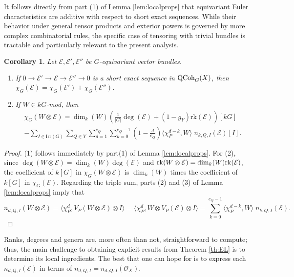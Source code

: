 \documentclass[10pt]{amsart}
\newtheorem{corollary}[theorem]{Corollary}
\theoremstyle{definition}
\begin{document}
It follows directly from part (1) of Lemma \ref{lem:localprops} that equivariant Euler characteristics are additive with respect to short exact sequences. While their behavior under general tensor products and exterior powers is governed by more complex combinatorial rules, the specific case of tensoring with trivial bundles is tractable and particularly relevant to the present analysis.
\begin{corollary}\label{eq:prodchar}
Let $\mathcal{E}, \mathcal{E}',\mathcal{E}''$ be $G$-equivariant vector bundles.
\begin{enumerate}
\item If $0\rightarrow \mathcal{E}'\rightarrow \mathcal{E}\rightarrow\mathcal{E}''\rightarrow 0$ is a short exact sequence in ${\rm QCoh}_G(X)$, then 
$
\chi_G(\mathcal{E})= \chi_G(\mathcal{E}')+\chi_G(\mathcal{E}'')
$.\\
\item If $W\in kG$-mod, then 
\begin{multline*}
\chi_G(W\otimes\mathcal{E})=\dim_k(W)  \left( 
\frac{1}{|G|} \deg(\mathcal{E})+(1-g_Y) \mathrm{rk}(\mathcal{E})
  \right)[kG]
\\
  - 
  \sum_{I \in \mathrm{Irr}(G)} 
  \sum_{Q\in Y}
  \sum_{d=1}^{e_Q}
\sum_{k=0}^{e_Q-1}
\left(
1 -\frac{d}{e_Q}
\right)\langle \chi_P^{d-k}, W\rangle \; n_{k,Q,I}(\mathcal{E}) [I].
\end{multline*}
\end{enumerate}

\end{corollary}
\begin{proof}
(1) follows immediately by part(1) of Lemma \ref{lem:localprops}. For (2), since $\deg(W\otimes\mathcal{E})=\dim_k(W)\deg(\mathcal{E})$ and ${\rm rk}(W\otimes\mathcal{E})=\dim_k(W){\rm rk}(\mathcal{E})$, the coefficient of $k[G]$ in $\chi_G(W\otimes\mathcal{E})$ is $\dim_k(W)$ times the coefficient of $k[G]$ in $\chi_G(\mathcal{E})$. Regarding the triple sum, parts (2) and (3) of Lemma \ref{lem:localprops} imply that
\[
n_{d,Q,I}(W\otimes\mathcal{E})=
\langle \chi_P^d,V_P(W\otimes\mathcal{E})\otimes I\rangle
=
\langle \chi_P^d,W\otimes V_P(\mathcal{E})\otimes I\rangle
=
\sum_{k=0}^{e_Q-1}\langle \chi_P^{d-k}, W\rangle \; n_{k,Q,I}(\mathcal{E}).
\]
\end{proof}
Ranks, degrees and genera are, more often than not, straightforward to compute; thus, the main challenge to obtaining explicit results from Theorem \ref{th:EL} is to determine its local ingredients. The best that one can hope for is to express each $n_{d,Q,I}(\mathcal{E})$ in terms of $n_{d,Q,I}=n_{d,Q,I}(\mathcal{O}_X)$.
\end{document}

